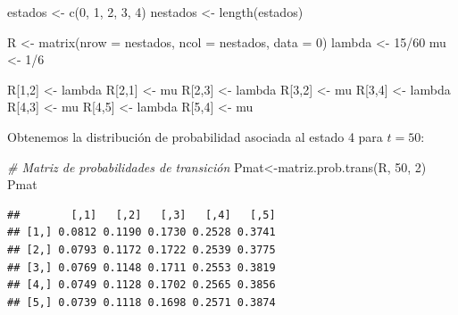 \documentclass[
]{book}
\newenvironment{Shaded}{\begin{snugshade}}{\end{snugshade}}
\newcommand{\AttributeTok}[1]{\textcolor[rgb]{0.77,0.63,0.00}{#1}}
\newcommand{\CommentTok}[1]{\textcolor[rgb]{0.56,0.35,0.01}{\textit{#1}}}
\newcommand{\DecValTok}[1]{\textcolor[rgb]{0.00,0.00,0.81}{#1}}
\newcommand{\FunctionTok}[1]{\textcolor[rgb]{0.00,0.00,0.00}{#1}}
\newcommand{\NormalTok}[1]{#1}
\newcommand{\OtherTok}[1]{\textcolor[rgb]{0.56,0.35,0.01}{#1}}
\newcommand{\SpecialCharTok}[1]{\textcolor[rgb]{0.00,0.00,0.00}{#1}}
\theoremstyle{definition}
\theoremstyle{definition}
\theoremstyle{definition}
\theoremstyle{definition}
\theoremstyle{remark}
\begin{document}
\begin{Shaded}
\begin{Highlighting}[]
\NormalTok{estados }\OtherTok{\textless{}{-}} \FunctionTok{c}\NormalTok{(}\DecValTok{0}\NormalTok{, }\DecValTok{1}\NormalTok{, }\DecValTok{2}\NormalTok{, }\DecValTok{3}\NormalTok{, }\DecValTok{4}\NormalTok{)}
\NormalTok{nestados }\OtherTok{\textless{}{-}} \FunctionTok{length}\NormalTok{(estados)}

\NormalTok{R }\OtherTok{\textless{}{-}} \FunctionTok{matrix}\NormalTok{(}\AttributeTok{nrow =}\NormalTok{ nestados, }\AttributeTok{ncol =}\NormalTok{ nestados, }\AttributeTok{data =} \DecValTok{0}\NormalTok{)}
\NormalTok{lambda }\OtherTok{\textless{}{-}} \DecValTok{15}\SpecialCharTok{/}\DecValTok{60}
\NormalTok{mu }\OtherTok{\textless{}{-}} \DecValTok{1}\SpecialCharTok{/}\DecValTok{6} 

\NormalTok{R[}\DecValTok{1}\NormalTok{,}\DecValTok{2}\NormalTok{] }\OtherTok{\textless{}{-}}\NormalTok{ lambda }
\NormalTok{R[}\DecValTok{2}\NormalTok{,}\DecValTok{1}\NormalTok{] }\OtherTok{\textless{}{-}}\NormalTok{ mu }
\NormalTok{R[}\DecValTok{2}\NormalTok{,}\DecValTok{3}\NormalTok{] }\OtherTok{\textless{}{-}}\NormalTok{ lambda }
\NormalTok{R[}\DecValTok{3}\NormalTok{,}\DecValTok{2}\NormalTok{] }\OtherTok{\textless{}{-}}\NormalTok{ mu }
\NormalTok{R[}\DecValTok{3}\NormalTok{,}\DecValTok{4}\NormalTok{] }\OtherTok{\textless{}{-}}\NormalTok{ lambda }
\NormalTok{R[}\DecValTok{4}\NormalTok{,}\DecValTok{3}\NormalTok{] }\OtherTok{\textless{}{-}}\NormalTok{ mu }
\NormalTok{R[}\DecValTok{4}\NormalTok{,}\DecValTok{5}\NormalTok{] }\OtherTok{\textless{}{-}}\NormalTok{ lambda}
\NormalTok{R[}\DecValTok{5}\NormalTok{,}\DecValTok{4}\NormalTok{] }\OtherTok{\textless{}{-}}\NormalTok{ mu}
\end{Highlighting}
\end{Shaded}

Obtenemos la distribución de probabilidad asociada al estado 4 para \(t = 50\):

\begin{Shaded}
\begin{Highlighting}[]
\CommentTok{\# Matriz de probabilidades de transición}
\NormalTok{Pmat}\OtherTok{\textless{}{-}}\FunctionTok{matriz.prob.trans}\NormalTok{(R, }\DecValTok{50}\NormalTok{, }\DecValTok{2}\NormalTok{)}
\NormalTok{Pmat}
\end{Highlighting}
\end{Shaded}

\begin{verbatim}
##        [,1]   [,2]   [,3]   [,4]   [,5]
## [1,] 0.0812 0.1190 0.1730 0.2528 0.3741
## [2,] 0.0793 0.1172 0.1722 0.2539 0.3775
## [3,] 0.0769 0.1148 0.1711 0.2553 0.3819
## [4,] 0.0749 0.1128 0.1702 0.2565 0.3856
## [5,] 0.0739 0.1118 0.1698 0.2571 0.3874
\end{verbatim}
\end{document}
